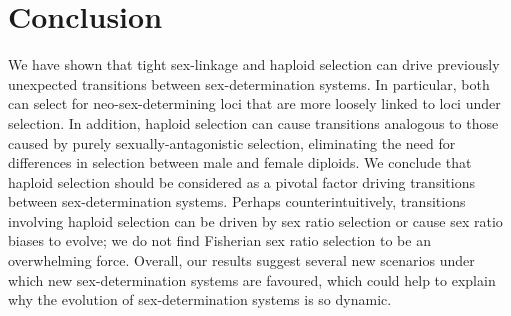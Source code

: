 \documentclass[10pt,letterpaper]{article}
\begin{document}

\section*{Conclusion}

We have shown that tight sex-linkage and haploid selection can drive previously unexpected transitions between sex-determination systems.
In particular, both can select for neo-sex-determining loci that are more loosely linked to loci under selection. 
In addition, haploid selection can cause transitions analogous to those caused by purely sexually-antagonistic selection, eliminating the need for differences in selection between male and female diploids.
We conclude that haploid selection should be considered as a pivotal factor driving transitions between sex-determination systems. 
Perhaps counterintuitively, transitions involving haploid selection can be driven by sex ratio selection or cause sex ratio biases to evolve; we do not find Fisherian sex ratio selection to be an overwhelming force. 
Overall, our results suggest several new scenarios under which new sex-determination systems are favoured, which could help to explain why the evolution of sex-determination systems is so dynamic. 
\end{document}
